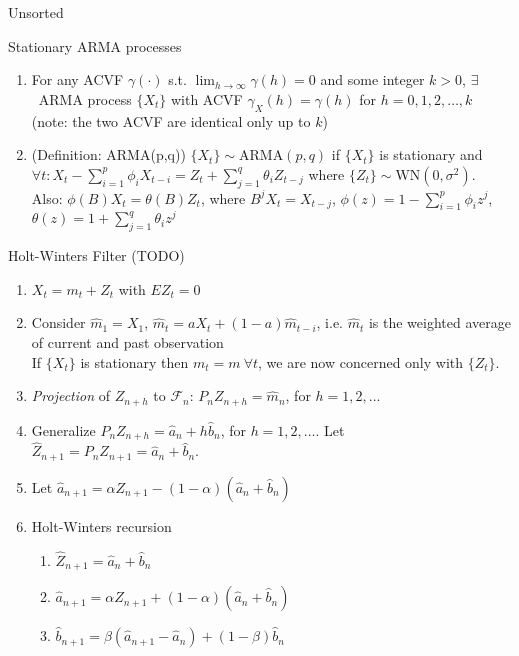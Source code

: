 \documentclass{article}
\begin{document}
\begin{section}{Unsorted}

\begin{subsection}{Stationary ARMA processes}
\begin{enumerate}
\item For any ACVF $\gamma(\cdot)$ s.t. $\lim_{h \to \infty} \gamma(h) = 0$
and some integer $k > 0$, $\exists$\ ARMA process $\{X_t\}$ with ACVF 
$\gamma_{X}(h) = \gamma(h)$ for $h = 0, 1, 2, \ldots, k$ (note: the two ACVF 
are identical only up to $k$)
\item (Definition: ARMA(p,q)) $\{X_t\} \sim \text{ARMA}(p,q)$ if 
$\{X_t\}$ is stationary and $\forall t: X_t - \sum_{i=1}^p \phi_i X_{t-i} =
 Z_t + \sum_{j=1}^q \theta_i Z_{t-j}$ where $\{Z_t\} \sim \text{WN}(0, 
 \sigma^2)$.\\
 
Also: $\phi(B) X_t = \theta(B) Z_t$, where $B^j X_t = X_{t-j}$, 
 $\phi(z) = 1 - \sum_{i=1}^p \phi_i z^j$, $\theta(z) = 1 + \sum_{j=1}^q 
 \theta_i z^j$
\end{enumerate}
\end{subsection}

\begin{subsection}{Holt-Winters Filter (TODO)}
\begin{enumerate}
\item $X_t = m_t + Z_t$ with $EZ_t = 0$
\item Consider $\hat{m}_1 = X_1$, $\hat{m}_t = a X_t + (1 - a)\hat{m}_{t-i}$, 
  i.e. $\hat{m}_t$ is the weighted average of current and past observation\\

If $\{X_t\}$ is stationary then $m_t = m~\forall t$, we are now concerned
only with $\{Z_t\}$.
\item \emph{Projection} of $Z_{n+h}$ to $\mathcal{F}_n$:
 $P_n Z_{n+h} = \hat{m}_n$, for $h = 1, 2, \ldots$\\
\item Generalize $P_n Z_{n+h} = \hat{a}_n + h \hat{b}_n$, for 
 $h = 1, 2, \ldots$. Let $\hat{Z}_{n+1} = P_n Z_{n+1} = \hat{a}_n + \hat{b}_n$.
\item Let $\hat{a}_{n+1} = \alpha Z_{n+1} - (1 - \alpha)(\hat{a}_n + 
 \hat{b}_n)$
\item Holt-Winters recursion
  \begin{enumerate}
  \item $\hat{Z}_{n+1} = \hat{a}_n + \hat{b}_n$
  \item $\hat{a}_{n+1} = \alpha Z_{n+1} + (1 - \alpha)(\hat{a}_n + \hat{b}_n)$
  \item $\hat{b}_{n+1} = \beta (\hat{a}_{n+1} - \hat{a}_n) + (1 - \beta) 
    \hat{b}_n$
  \end{enumerate}
\end{enumerate}
\end{subsection}
\end{section}
\end{document}

